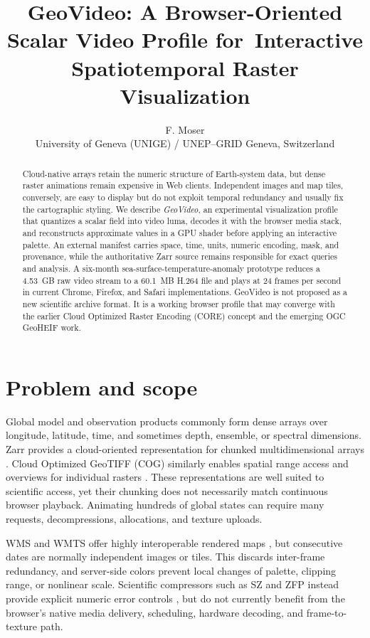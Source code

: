\documentclass[11pt]{article}
\title{\vspace{-1.4em}\textbf{GeoVideo: A Browser-Oriented Scalar Video Profile for\
Interactive Spatiotemporal Raster Visualization}\vspace{-0.4em}}
\author{F. Moser\\
\small University of Geneva (UNIGE) / UNEP--GRID Geneva, Switzerland}
\date{}
\begin{document}
\maketitle
\vspace{-1.2em}

\begin{abstract}
Cloud-native arrays retain the numeric structure of Earth-system data, but dense raster animations remain expensive in Web clients. Independent images and map tiles, conversely, are easy to display but do not exploit temporal redundancy and usually fix the cartographic styling. We describe \emph{GeoVideo}, an experimental visualization profile that quantizes a scalar field into video luma, decodes it with the browser media stack, and reconstructs approximate values in a GPU shader before applying an interactive palette. An external manifest carries space, time, units, numeric encoding, mask, and provenance, while the authoritative Zarr source remains responsible for exact queries and analysis. A six-month sea-surface-temperature-anomaly prototype reduces a 4.53~GB raw video stream to a 60.1~MB H.264 file and plays at 24 frames per second in current Chrome, Firefox, and Safari implementations. GeoVideo is not proposed as a new scientific archive format. It is a working browser profile that may converge with the earlier Cloud Optimized Raster Encoding (CORE) concept and the emerging OGC GeoHEIF work.
\end{abstract}

\section{Problem and scope}
Global model and observation products commonly form dense arrays over longitude, latitude, time, and sometimes depth, ensemble, or spectral dimensions. Zarr provides a cloud-oriented representation for chunked multidimensional arrays \cite{zarrv3}. Cloud Optimized GeoTIFF (COG) similarly enables spatial range access and overviews for individual rasters \cite{ogccog}. These representations are well suited to scientific access, yet their chunking does not necessarily match continuous browser playback. Animating hundreds of global states can require many requests, decompressions, allocations, and texture uploads.

WMS and WMTS offer highly interoperable rendered maps \cite{ogcwms,ogcwmts}, but consecutive dates are normally independent images or tiles. This discards inter-frame redundancy, and server-side colors prevent local changes of palette, clipping range, or nonlinear scale. Scientific compressors such as SZ and ZFP instead provide explicit numeric error controls \cite{sz,zfp}, but do not currently benefit from the browser's native media delivery, scheduling, hardware decoding, and frame-to-texture path.
\end{document}

